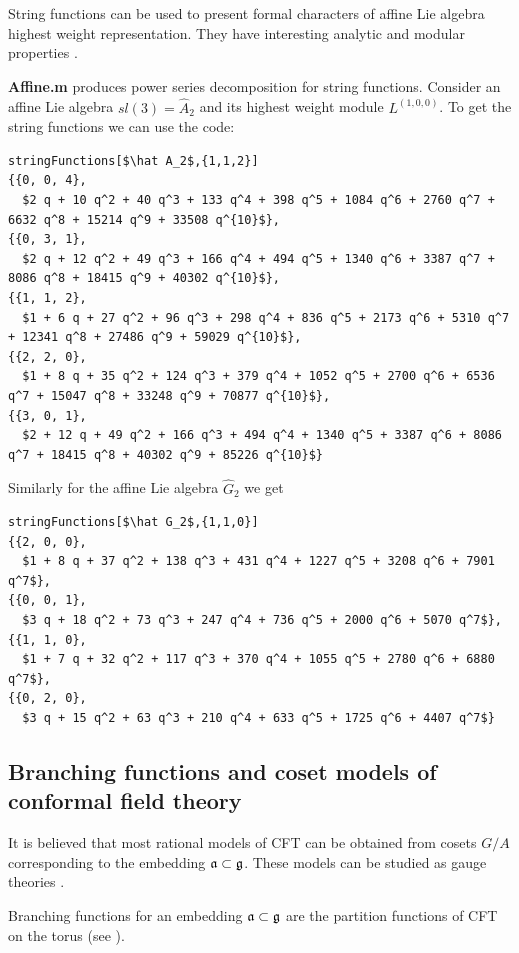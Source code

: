 String functions can be used to present formal characters of affine Lie algebra highest weight representation. They have interesting analytic and modular properties \cite{kac1990idl,kac1988modular,kac1984infinite}.

{\bf Affine.m} produces power series decomposition for string functions. Consider an affine Lie algebra $\hat{sl(3)}=\hat A_{2}$ and its highest weight module $L^{(1,0,0)}$. To get the string functions we can use the code:
\begin{lstlisting}[mathescape=true]
stringFunctions[$\hat A_2$,{1,1,2}]
{{0, 0, 4}, 
  $2 q + 10 q^2 + 40 q^3 + 133 q^4 + 398 q^5 + 1084 q^6 + 2760 q^7 + 6632 q^8 + 15214 q^9 + 33508 q^{10}$}, 
{{0, 3, 1}, 
  $2 q + 12 q^2 + 49 q^3 + 166 q^4 + 494 q^5 + 1340 q^6 + 3387 q^7 + 8086 q^8 + 18415 q^9 + 40302 q^{10}$}, 
{{1, 1, 2}, 
  $1 + 6 q + 27 q^2 + 96 q^3 + 298 q^4 + 836 q^5 + 2173 q^6 + 5310 q^7 + 12341 q^8 + 27486 q^9 + 59029 q^{10}$}, 
{{2, 2, 0}, 
  $1 + 8 q + 35 q^2 + 124 q^3 + 379 q^4 + 1052 q^5 + 2700 q^6 + 6536 q^7 + 15047 q^8 + 33248 q^9 + 70877 q^{10}$}, 
{{3, 0, 1}, 
  $2 + 12 q + 49 q^2 + 166 q^3 + 494 q^4 + 1340 q^5 + 3387 q^6 + 8086 q^7 + 18415 q^8 + 40302 q^9 + 85226 q^{10}$}
\end{lstlisting}
Similarly for the affine Lie algebra $\hat G_{2}$ we get
\begin{lstlisting}[mathescape=true]
stringFunctions[$\hat G_2$,{1,1,0}]
{{2, 0, 0}, 
  $1 + 8 q + 37 q^2 + 138 q^3 + 431 q^4 + 1227 q^5 + 3208 q^6 + 7901 q^7$}, 
{{0, 0, 1}, 
  $3 q + 18 q^2 + 73 q^3 + 247 q^4 + 736 q^5 + 2000 q^6 + 5070 q^7$}, 
{{1, 1, 0},
  $1 + 7 q + 32 q^2 + 117 q^3 + 370 q^4 + 1055 q^5 + 2780 q^6 + 6880 q^7$}, 
{{0, 2, 0}, 
  $3 q + 15 q^2 + 63 q^3 + 210 q^4 + 633 q^5 + 1725 q^6 + 4407 q^7$}
\end{lstlisting}

\subsection{Branching functions and coset models of conformal field theory}
\label{sec:branch-funct-coset}

It is believed that most rational models of CFT can be obtained from cosets $G/A$ corresponding to the embedding $\mathfrak{a}\subset\mathfrak{g}$. These models can be studied as gauge theories \cite{Hwang:1994yr, hwang1993brst}.

Branching functions for an embedding $\mathfrak{a}\subset\mathfrak{g}$ are the partition functions of CFT on the torus (see \cite{difrancesco1997cft}).

